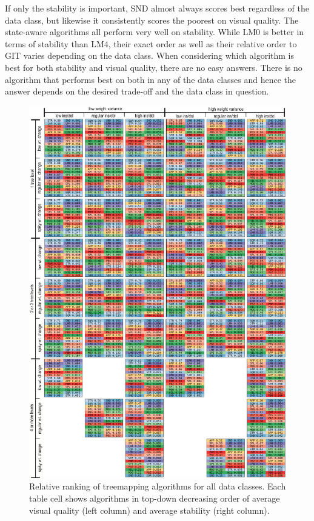 %
If only the stability is important, SND almost always scores best regardless of the data class, but likewise it consistently scores the poorest on visual quality. 
The state-aware algorithms all perform very well on stability. While LM0 is better in terms of stability than LM4, their exact order as well as their relative order to GIT varies depending on the data class.
%
When considering which algorithm is best for both stability and visual quality, there are no easy answers. There is no algorithm that performs best on both in any of the data classes and hence the answer depends on the desired trade-off and the data class in question.



\begin{figure}[htbp!]
\centering
\includegraphics[width=\linewidth]{figures/treemap-evaluation/rankingtable.png}
\caption{Relative ranking of treemapping algorithms for all data classes. Each table cell shows algorithms in top-down decreasing order of average visual quality (left column) and average stability (right column).}
\label{fig:rankingtable}
\end{figure}


